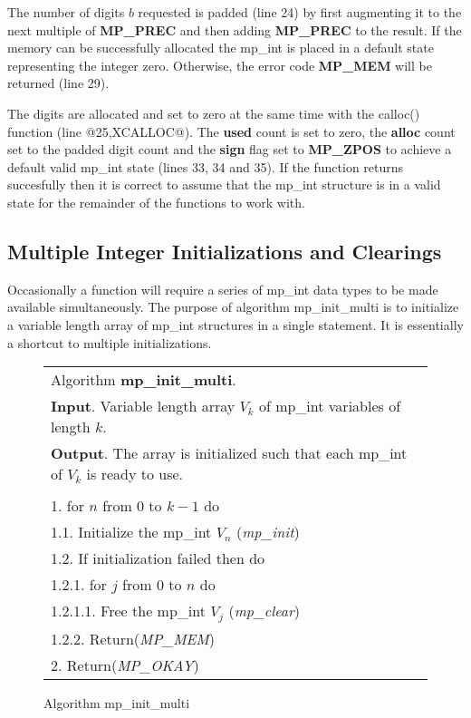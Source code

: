 \documentclass[b5paper]{book}
\begin{document}
The number of digits $b$ requested is padded (line 24) by first augmenting it to the next multiple of 
\textbf{MP\_PREC} and then adding \textbf{MP\_PREC} to the result.  If the memory can be successfully allocated the 
mp\_int is placed in a default state representing the integer zero.  Otherwise, the error code \textbf{MP\_MEM} will be 
returned (line 29).  

The digits are allocated and set to zero at the same time with the calloc() function (line @25,XCALLOC@).  The 
\textbf{used} count is set to zero, the \textbf{alloc} count set to the padded digit count and the \textbf{sign} flag set 
to \textbf{MP\_ZPOS} to achieve a default valid mp\_int state (lines 33, 34 and 35).  If the function 
returns succesfully then it is correct to assume that the mp\_int structure is in a valid state for the remainder of the 
functions to work with.

\subsection{Multiple Integer Initializations and Clearings}
Occasionally a function will require a series of mp\_int data types to be made available simultaneously.  
The purpose of algorithm mp\_init\_multi is to initialize a variable length array of mp\_int structures in a single
statement.  It is essentially a shortcut to multiple initializations.

\newpage\begin{figure}[here]
\begin{center}
\begin{tabular}{l}
\hline Algorithm \textbf{mp\_init\_multi}. \\
\textbf{Input}.   Variable length array $V_k$ of mp\_int variables of length $k$. \\
\textbf{Output}.  The array is initialized such that each mp\_int of $V_k$ is ready to use. \\
\hline \\
1.  for $n$ from 0 to $k - 1$ do \\
\hspace{+3mm}1.1.  Initialize the mp\_int $V_n$ (\textit{mp\_init}) \\
\hspace{+3mm}1.2.  If initialization failed then do \\
\hspace{+6mm}1.2.1.  for $j$ from $0$ to $n$ do \\
\hspace{+9mm}1.2.1.1.  Free the mp\_int $V_j$ (\textit{mp\_clear}) \\
\hspace{+6mm}1.2.2.   Return(\textit{MP\_MEM}) \\
2.  Return(\textit{MP\_OKAY}) \\
\hline
\end{tabular}
\end{center}
\caption{Algorithm mp\_init\_multi}
\end{figure}
\end{document}
